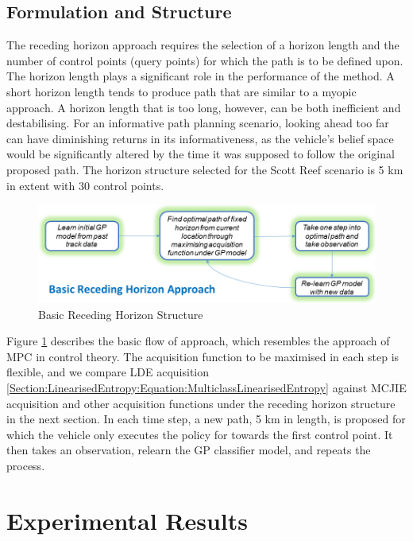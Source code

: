 \documentclass{article}
\begin{document}
	\subsection{Formulation and Structure}

		The receding horizon approach requires the selection of a horizon length and the number of control points (query points) for which the path is to be defined upon. The horizon length plays a significant role in the performance of the method. A short horizon length tends to produce path that are similar to a myopic approach. A horizon length that is too long, however, can be both inefficient and destabilising. For an informative path planning scenario, looking ahead too far can have diminishing returns in its informativeness, as the vehicle's belief space would be significantly altered by the time it was supposed to follow the original proposed path. The horizon structure selected for the Scott Reef scenario is 5 km in extent with 30 control points.

		\begin{figure}[!htbp]
		\centering
			\includegraphics[width = \linewidth]{Figures/receding_horizon_informative_path_planning.png}
		\caption{Basic Receding Horizon Structure}
		\label{Figure:Results:RecedingHorizonMethodOutline}
		\end{figure}
				
		Figure \ref{Figure:Results:RecedingHorizonMethodOutline} describes the basic flow of approach, which resembles the approach of MPC in control theory. The acquisition function to be maximised in each step is flexible, and we compare LDE acquisition \eqref{Section:LinearisedEntropy:Equation:MulticlassLinearisedEntropy} against MCJIE acquisition and other acquisition functions under the receding horizon structure in the next section. In each time step, a new path, 5 km in length, is proposed for which the vehicle only executes the policy for towards the first control point. It then takes an observation, relearn the GP classifier model, and repeats the process. 
		
\section{Experimental Results}
\label{Section:ExperimentalResults}
\end{document}
